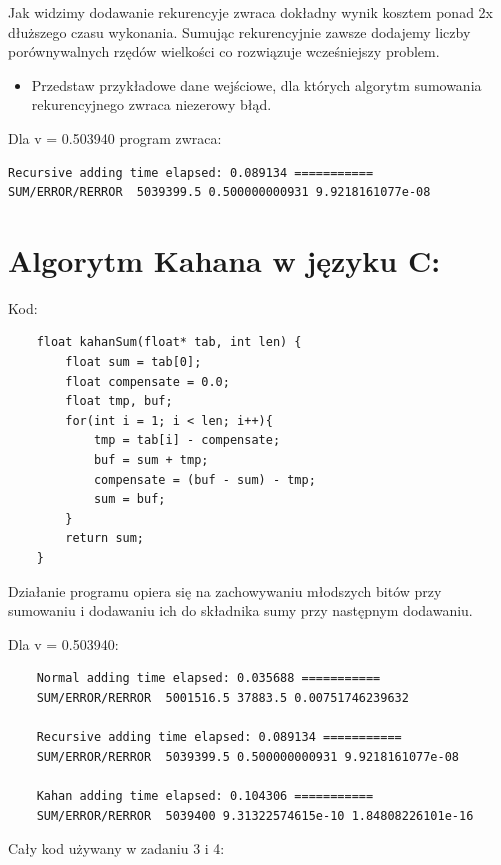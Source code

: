 Jak widzimy dodawanie rekurencyje zwraca dokładny wynik kosztem ponad 2x dłuższego czasu wykonania. Sumując rekurencyjnie zawsze dodajemy liczby porównywalnych rzędów wielkości co rozwiązuje wcześniejszy problem.

\begin{itemize}
	\item Przedstaw przykładowe dane wejściowe, dla których algorytm sumowania rekurencyjnego zwraca niezerowy błąd.
\end{itemize}

Dla v = 0.503940 program zwraca:

\begin{lstlisting}
Recursive adding time elapsed: 0.089134 ===========
SUM/ERROR/RERROR  5039399.5 0.500000000931 9.9218161077e-08
\end{lstlisting}


\section{Algorytm Kahana w języku C:}

Kod:

\begin{verbatim}
	float kahanSum(float* tab, int len) {
		float sum = tab[0];
		float compensate = 0.0;
		float tmp, buf;
		for(int i = 1; i < len; i++){
			tmp = tab[i] - compensate;
			buf = sum + tmp;
			compensate = (buf - sum) - tmp;
			sum = buf;
		}
		return sum;
	}
\end{verbatim}

Działanie programu opiera się na zachowywaniu młodszych bitów przy sumowaniu i dodawaniu ich do składnika sumy przy następnym dodawaniu.

Dla v = 0.503940:

\begin{lstlisting}
	Normal adding time elapsed: 0.035688 ===========
	SUM/ERROR/RERROR  5001516.5 37883.5 0.00751746239632

	Recursive adding time elapsed: 0.089134 ===========
	SUM/ERROR/RERROR  5039399.5 0.500000000931 9.9218161077e-08

	Kahan adding time elapsed: 0.104306 ===========
	SUM/ERROR/RERROR  5039400 9.31322574615e-10 1.84808226101e-16
\end{lstlisting}
	


\clearpage
\newpage

Cały kod używany w zadaniu 3 i 4:

